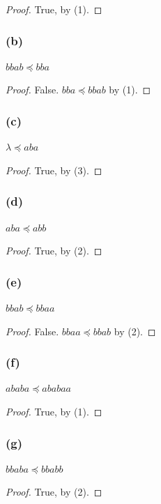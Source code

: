 \documentclass[14pt]{extarticle}
\begin{document}
\begin{proof}
        True, by (1).
\end{proof}

\subsubsection{(b)}
\(bbab \preceq bba\)

\begin{proof}
        False. \(bba \preceq bbab\) by (1).
\end{proof}

\subsubsection{(c)}
\(\lambda \preceq aba\)

\begin{proof}
        True, by (3).
\end{proof}

\subsubsection{(d)}
\(aba \preceq abb\)

\begin{proof}
        True, by (2).
\end{proof}

\subsubsection{(e)}
\(bbab \preceq bbaa\)

\begin{proof}
        False. \(bbaa \preceq bbab\) by (2).
\end{proof}

\subsubsection{(f)}
\(ababa \preceq ababaa\)

\begin{proof}
        True, by (1).
\end{proof}

\subsubsection{(g)}
\(bbaba \preceq bbabb\)

\begin{proof}
        True, by (2).
\end{proof}
\end{document}
